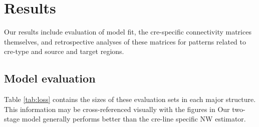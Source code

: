\section{Results}

Our results include evaluation of model fit, the cre-specific connectivity matrices themselves, and retrospective analyses of these matrices for  patterns related to cre-type and source and target regions.

\subsection{Model evaluation}
\label{sec:model_eval}

Table \ref{tab:loss} contains the sizes of these evaluation sets in each major structure.
This information may be cross-referenced visually with the figures in 
Our two-stage model generally performs better than the cre-line specific NW estimator.

